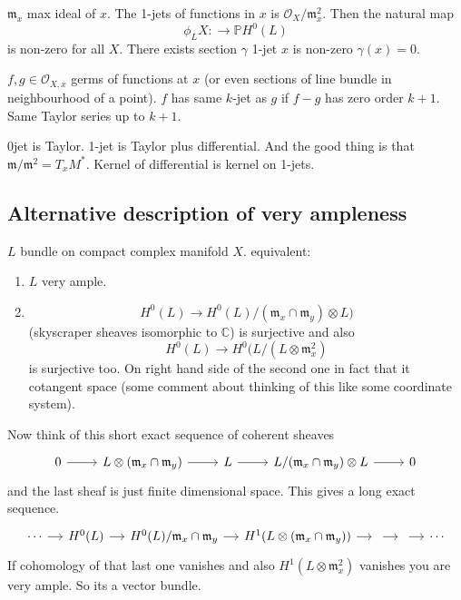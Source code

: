 \begin{remark}
	$\mathfrak{m}_x$ max ideal of $x$. The 1-jets of functions in $x$ is $\mathcal{O}_X/\mathfrak{m}_x^2$. Then the natural map
	\[\phi_LX:\to \mathbb{P}H^{0}(L)\]
	is non-zero for all $X$. There exists section $\gamma$ 1-jet $x$ is non-zero $\gamma(x)=0$.
\end{remark}

\begin{defn}
	$f,g\in\mathcal{O}_{X,x}$ germs of functions at $x$ (or even sections of line bundle in neighbourhood of a point). $f$ has same  $k$-jet as $g$ if $f-g$ has zero order $k+1$. Same Taylor series up to $k+1$. 

	0jet is Taylor. 1-jet is Taylor plus differential. And the good thing is that $\mathfrak{m}/\mathfrak{m}^2=T_xM^*$. Kernel of differential is kernel on 1-jets.
\end{defn}

\subsection{Alternative description of very ampleness}

\begin{coro}
	$L$ bundle on compact complex manifold $X$. equivalent:
	\begin{enumerate}[label=(\roman*)]
		\item $L$ very ample.
		\item \[ H^{0}(L)\to H^{0}(L)/(\mathfrak{m}_x\cap \mathfrak{m}_y)\otimes L)\] (skyscraper sheaves isomorphic to $\mathbb{C}$) is surjective and also
				\[H^{0}(L)\to H^{0}(L/(L\otimes \mathfrak{m}_x^2)\]
				is surjective too. On right hand side of the second one in fact that it cotangent space (some comment about thinking of this like some coordinate system).
	\end{enumerate}
\end{coro}

Now think of this short exact sequence of coherent sheaves
\[\begin{tikzcd}
	0\arrow[r]&L\otimes (\mathfrak{m}_x\cap\mathfrak{m}_y)\arrow[r]&L\arrow[r]&L/(\mathfrak{m}_x\cap\mathfrak{m}_y)\otimes L\arrow[r]&0
\end{tikzcd}\]
and the last sheaf is just finite dimensional space. This gives a long exact sequence.
\[\begin{tikzcd}[column sep=small]
	\cdots\arrow[r]&H^{0}(L)\arrow[r]&H^{0}(L)/\mathfrak{m}_x\cap \mathfrak{m}_y\arrow[r]&H^{1}(L\otimes (\mathfrak{m}_x\cap \mathfrak{m}_y))\arrow[r]&\arrow[r]&\arrow[r]&\cdots
\end{tikzcd}\]
If cohomology of that last one vanishes and also $H^{1}(L\otimes \mathfrak{m}_x^2)$ vanishes you are very ample. So its a vector bundle.

